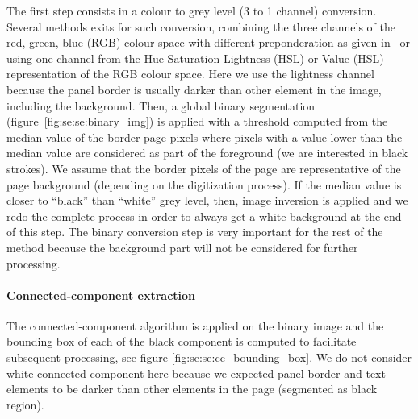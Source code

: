 The first step consists in a colour to grey level (3 to 1 channel) conversion.
Several methods exits for such conversion, combining the three channels of the red, green, blue (RGB) colour space with different preponderation as given in~\cite{Pratt91} or using one channel from the Hue Saturation Lightness (HSL) or Value (HSL) representation of the RGB colour space.
Here we use the lightness channel because the panel border is usually darker than other element in the image, including the background. 
Then, a global binary segmentation (figure~\ref{fig:se:se:binary_img}) is applied with a threshold computed from the median value of the border page pixels where pixels with a value lower than the median value are considered as part of the foreground (we are interested in black strokes).
We assume that the border pixels of the page are representative of the page background (depending on the digitization process).
If the median value is closer to ``black'' than ``white'' grey level, then, image inversion is applied and we redo the complete process in order to always get a white background at the end of this step.
The binary conversion step is very important for the rest of the method because the background part will not be considered for further processing. %


\paragraph{Connected-component extraction} %
 \label{par:connected_component_extraction}
 
The connected-component algorithm is applied on the binary image and the bounding box of each of the black component is computed to facilitate subsequent processing, see figure \ref{fig:se:se:cc_bounding_box}.
We do not consider white connected-component here because we expected panel border and text elements to be darker than other elements in the page (segmented as black region).

